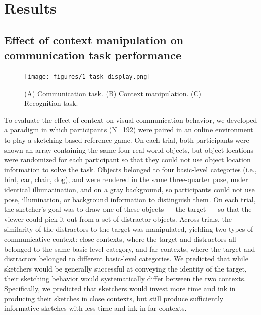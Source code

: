 \documentclass[9pt,twocolumn,twoside]{pnas-new}
\begin{document}
\section*{Results}

\subsection*{Effect of context manipulation on communication task performance}



\begin{figure}[htbp]
\centering
\texttt{[image: figures/1\_task\_display.png]}
\caption{(A) Communication task. (B) Context manipulation. (C) Recognition task.}
\label{task_display}
\end{figure}

To evaluate the effect of context on visual communication behavior, we developed a paradigm in which participants (N=192) were paired in an online environment to play a sketching-based reference game. On each trial, both participants were shown an array containing the same four real-world objects, but object locations were randomized for each participant so that they could not use object location information to solve the task. Objects belonged to four basic-level categories (i.e., bird, car, chair, dog), and were rendered in the same three-quarter pose, under identical illumatination, and on a gray background, so participants could not use pose, illumination, or background information to distinguish them. 
On each trial, the sketcher's goal was to draw one of these objects --- the target --- so that the viewer could pick it out from a set of distractor objects. 
Across trials, the similarity of the distractors to the target was manipulated, yielding two types of communicative context: close contexts, where the target and distractors all belonged to the same basic-level category, and far contexts, where the target and distractors belonged to different basic-level categories. 
We predicted that while sketchers would be generally successful at conveying the identity of the target, their sketching behavior would systematically differ between the two contexts. 
Specifically, we predicted that sketchers would invest more time and ink in producing their sketches in close contexts, but still produce sufficiently informative sketches with less time and ink in far contexts. 
\end{document}
